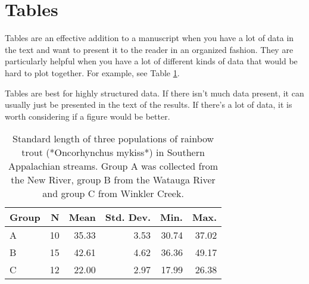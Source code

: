 \documentclass[]{book}
\begin{document}
\section{Tables}\label{tables}

Tables are an effective addition to a manuscript when you have a lot of
data in the text and want to present it to the reader in an organized
fashion. They are particularly helpful when you have a lot of different
kinds of data that would be hard to plot together. For example, see
Table \ref{tab:table1}.

Tables are best for highly structured data. If there isn't much data
present, it can usually just be presented in the text of the results. If
there's a lot of data, it is worth considering if a figure would be
better.

\begin{table}[t]

\caption{\label{tab:table1}Standard length of three populations of rainbow trout (*Oncorhynchus mykiss*) in Southern Appalachian streams.  Group A was collected from the New River, group B from the Watauga River and group C from Winkler Creek.}
\centering
\begin{tabular}{lrrrrr}
\toprule
Group & N & Mean & Std. Dev. & Min. & Max.\\
\midrule
A & 10 & 35.33 & 3.53 & 30.74 & 37.02\\
B & 15 & 42.61 & 4.62 & 36.36 & 49.17\\
C & 12 & 22.00 & 2.97 & 17.99 & 26.38\\
\bottomrule
\end{tabular}
\end{table}


\end{document}
